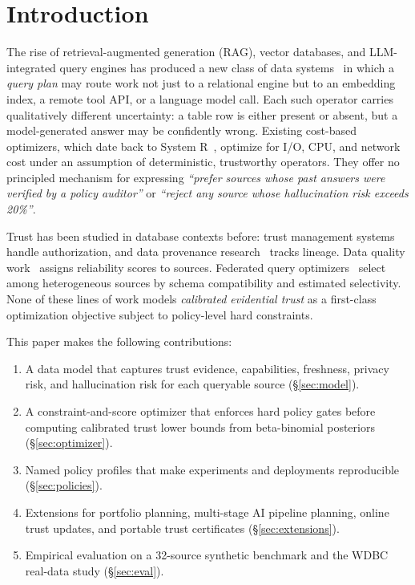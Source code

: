 \documentclass[runningheads]{llncs}
\begin{document}

\section{Introduction}
\label{sec:intro}

The rise of retrieval-augmented generation (RAG), vector databases, and
LLM-integrated query engines has produced a new class of data
systems~\cite{lewis2020rag,borgeaud2022retro} in which a
\emph{query plan} may route work not just to a relational engine but to
an embedding index, a remote tool API, or a language model call.  Each
such operator carries qualitatively different uncertainty: a table row is
either present or absent, but a model-generated answer may be
confidently wrong.  Existing cost-based optimizers, which date back to
System R~\cite{selinger1979access}, optimize for I/O, CPU, and network
cost under an assumption of deterministic, trustworthy operators.  They
offer no principled mechanism for expressing \emph{``prefer sources
whose past answers were verified by a policy auditor''}  or
\emph{``reject any source whose hallucination risk exceeds 20\%''}.

Trust has been studied in database contexts before: trust management
systems~\cite{blaze1996decentralized} handle authorization, and data
provenance research~\cite{buneman2001provenance} tracks lineage.  Data
quality work~\cite{batini2009methodologies} assigns reliability scores to
sources.  Federated query optimizers~\cite{levy1996querying} select among
heterogeneous sources by schema compatibility and estimated selectivity.
None of these lines of work models \emph{calibrated evidential trust} as
a first-class optimization objective subject to policy-level hard
constraints.

This paper makes the following contributions:
\begin{enumerate}
  \item A data model that captures trust evidence, capabilities,
    freshness, privacy risk, and hallucination risk for each queryable
    source (\S\ref{sec:model}).
  \item A constraint-and-score optimizer that enforces hard policy gates
    before computing calibrated trust lower bounds from beta-binomial
    posteriors (\S\ref{sec:optimizer}).
  \item Named policy profiles that make experiments and deployments
    reproducible (\S\ref{sec:policies}).
  \item Extensions for portfolio planning, multi-stage AI pipeline
    planning, online trust updates, and portable trust certificates
    (\S\ref{sec:extensions}).
  \item Empirical evaluation on a 32-source synthetic benchmark and the
    WDBC real-data study (\S\ref{sec:eval}).
\end{enumerate}
\end{document}
